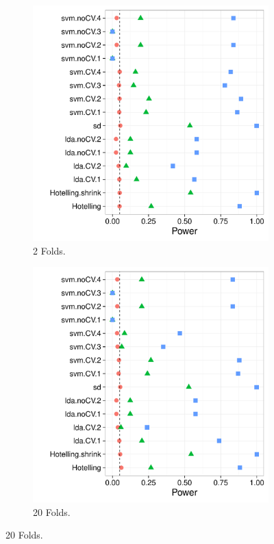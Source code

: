 \documentclass[12pt,a4paper]{article}
\begin{document}
\begin{figure}[h]
\centering
\caption{\footnotesize [TODO].}	
	\begin{subfigure}{.5\textwidth}
	  \centering
	  \includegraphics[width=1\linewidth]{"art/2016-07-27 21:21:12"}
	  \caption{2 Folds.}  %
	\label{fig:2016-07-2721:21:12}
	\end{subfigure}%
	\begin{subfigure}{.5\textwidth}
	  \centering
	  \includegraphics[width=1\linewidth]{"art/2016-07-29 07:18:24"}
	  \caption{20 Folds.} %
	\end{subfigure}
\end{figure}
\end{document}
